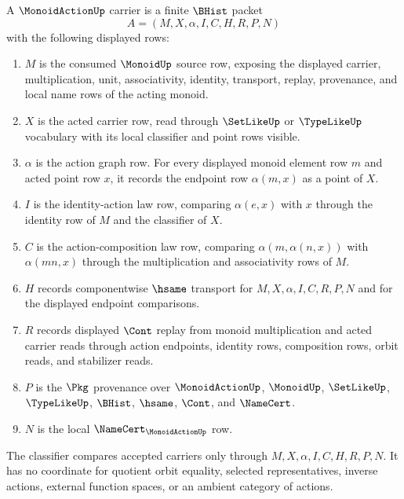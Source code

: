 \begin{definition}
\label{def:monoid-action-carrier}
A $\MonoidActionUp$ carrier is a finite $\BHist$ packet
$$
A=(M,X,\alpha,I,C,H,R,P,N)
$$
with the following displayed rows:
\begin{enumerate}
\item $M$ is the consumed $\MonoidUp$ source row, exposing the displayed carrier, multiplication, unit, associativity, identity, transport, replay, provenance, and local name rows of the acting monoid.
\item $X$ is the acted carrier row, read through $\SetLikeUp$ or $\TypeLikeUp$ vocabulary with its local classifier and point rows visible.
\item $\alpha$ is the action graph row. For every displayed monoid element row $m$ and acted point row $x$, it records the endpoint row $\alpha(m,x)$ as a point of $X$.
\item $I$ is the identity-action law row, comparing $\alpha(e,x)$ with $x$ through the identity row of $M$ and the classifier of $X$.
\item $C$ is the action-composition law row, comparing $\alpha(m,\alpha(n,x))$ with $\alpha(mn,x)$ through the multiplication and associativity rows of $M$.
\item $H$ records componentwise $\hsame$ transport for $M,X,\alpha,I,C,R,P,N$ and for the displayed endpoint comparisons.
\item $R$ records displayed $\Cont$ replay from monoid multiplication and acted carrier reads through action endpoints, identity rows, composition rows, orbit reads, and stabilizer reads.
\item $P$ is the $\Pkg$ provenance over $\MonoidActionUp$, $\MonoidUp$, $\SetLikeUp$, $\TypeLikeUp$, $\BHist$, $\hsame$, $\Cont$, and $\NameCert$.
\item $N$ is the local $\NameCert_{\MonoidActionUp}$ row.
\end{enumerate}
The classifier compares accepted carriers only through $M,X,\alpha,I,C,H,R,P,N$. It has no coordinate for quotient orbit equality, selected representatives, inverse actions, external function spaces, or an ambient category of actions.
\end{definition}

